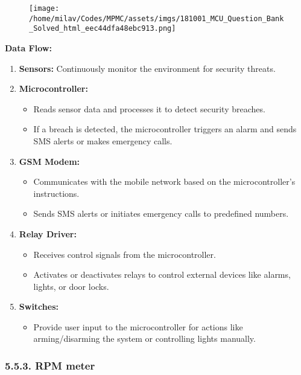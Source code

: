 \documentclass[
]{article}
\begin{document}
\begin{figure}
\centering
\texttt{[image: /home/milav/Codes/MPMC/assets/imgs/181001\_MCU\_Question\_Bank\_Solved\_html\_eec44dfa48ebc913.png]}
\caption{}
\end{figure}

\textbf{Data Flow:}

\begin{enumerate}
\def\labelenumi{\arabic{enumi}.}
\item
  \textbf{Sensors:} Continuously monitor the environment for security
  threats.
\item
  \textbf{Microcontroller:}

  \begin{itemize}
  \item
    Reads sensor data and processes it to detect security breaches.
  \item
    If a breach is detected, the microcontroller triggers an alarm and
    sends SMS alerts or makes emergency calls.
  \end{itemize}
\item
  \textbf{GSM Modem:}

  \begin{itemize}
  \item
    Communicates with the mobile network based on the microcontroller's
    instructions.
  \item
    Sends SMS alerts or initiates emergency calls to predefined numbers.
  \end{itemize}
\item
  \textbf{Relay Driver:}

  \begin{itemize}
  \item
    Receives control signals from the microcontroller.
  \item
    Activates or deactivates relays to control external devices like
    alarms, lights, or door locks.
  \end{itemize}
\item
  \textbf{Switches:}

  \begin{itemize}
  \item
    Provide user input to the microcontroller for actions like
    arming/disarming the system or controlling lights manually.
  \end{itemize}
\end{enumerate}

\hypertarget{553-rpm-meter}{%
\subsubsection{5.5.3. RPM meter}\label{553-rpm-meter}}
\end{document}
